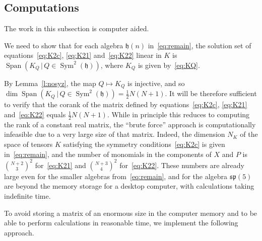 \documentclass[12pt,reqno]{amsart}
\newcommand \Span{\operatorname{Span}}
\newcommand\h{\mathfrak h}
\newcommand \spg{\mathfrak{sp}}
\newcommand \Sym{\operatorname{Sym}}
\newcommand \<{\langle}
\renewcommand \>{\rangle}
\theoremstyle{definition}
\theoremstyle{remark}
\begin{document}
	\subsection{Computations}
	\label{ss:sage}

The work in this subsection is computer aided.

We need to show that for each algebra $\h(n)$ in~\eqref{eq:remain}, the solution set of equations~\eqref{eq:K2c}, \eqref{eq:K21} and~\eqref{eq:K22} linear in $K$ is $\Span(K_Q \, | \, Q \in \Sym^2 (\h))$, where $K_Q$ is given by~\eqref{eq:KQ}.

By Lemma~\ref{l:nosyz}, the map $Q \mapsto K_Q$ is injective, and so $\dim\Span(K_Q \, | \, Q \in \Sym^2 (\h)) = \frac12 N (N+1)$. It will be therefore sufficient to verify that the corank of the matrix defined by equations~\eqref{eq:K2c}, \eqref{eq:K21} and~\eqref{eq:K22} equals $\frac12 N (N+1)$. While in principle this reduces to computing the rank of a constant real matrix, the ``brute force'' approach is computationally infeasible due to a very large size of that matrix. Indeed, the dimension $N_K$ of the space of tensors $K$ satisfying the symmetry conditions~\eqref{eq:K2c} is given in~\eqref{eq:remain}, and the number of monomials in the components of $X$ and $P$ is $\binom{N+2}{3}^2$ for~\eqref{eq:K21} and $\binom{N+3}{4}^2$ for~\eqref{eq:K22}. These numbers are already large even for the smaller algebras from~\eqref{eq:remain}, and for the algebra $\spg(5)$ are beyond the memory storage for a desktop computer, with calculations taking indefinite time.

To avoid storing a matrix of an enormous size in the computer memory and to be able to perform calculations in reasonable time, we implement the following approach.
\end{document}
